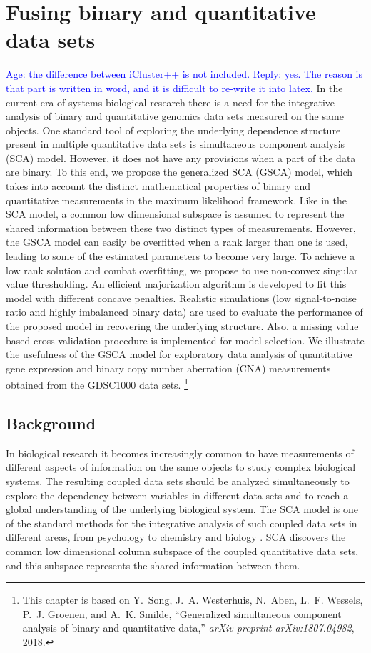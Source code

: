 \chapter{Fusing binary and quantitative data sets} \label{chapter:4}
\textcolor{blue}{Age: the difference between iCluster++ is not included. Reply: yes. The reason is that part is written in word, and it is difficult to re-write it into latex.} In the current era of systems biological research there is a need for the integrative analysis of binary and quantitative genomics data sets measured on the same objects. One standard tool of exploring the underlying dependence structure present in multiple quantitative data sets is simultaneous component analysis (SCA) model. However, it does not have any provisions when a part of the data are binary. To this end, we propose the generalized SCA (GSCA) model, which takes into account the distinct mathematical properties of binary and quantitative measurements in the maximum likelihood framework. Like in the SCA model, a common low dimensional subspace is assumed to represent the shared information between these two distinct types of measurements. However, the GSCA model can easily be overfitted when a rank larger than one is used, leading to some of the estimated parameters to become very large. To achieve a low rank solution and combat overfitting, we propose to use non-convex singular value thresholding. An efficient majorization algorithm is developed to fit this model with different concave penalties. Realistic simulations (low signal-to-noise ratio and highly imbalanced binary data) are used to evaluate the performance of the proposed model in recovering the underlying structure. Also, a missing value based cross validation procedure is implemented for model selection. We illustrate the usefulness of the GSCA model for exploratory data analysis of quantitative gene expression and binary copy number aberration (CNA) measurements obtained from the GDSC1000 data sets.
\footnote{This chapter is based on Y.~Song, J.~A. Westerhuis, N.~Aben, L.~F. Wessels, P.~J. Groenen, and A.~K.
  Smilde, ``Generalized simultaneous component analysis of binary and
  quantitative data,'' {\em arXiv preprint arXiv:1807.04982}, 2018.}

\section{Background} \label{section:4.1}
In biological research it becomes increasingly common to have measurements of different aspects of information on the same objects to study complex biological systems. The resulting coupled data sets should be analyzed simultaneously to explore the dependency between variables in different data sets and to reach a global understanding of the underlying biological system. The SCA model is one of the standard methods for the integrative analysis of such coupled data sets in different areas, from psychology to chemistry and biology \cite{van2009structured}. SCA discovers the common low dimensional column subspace of the coupled quantitative data sets, and this subspace represents the shared information between them.

